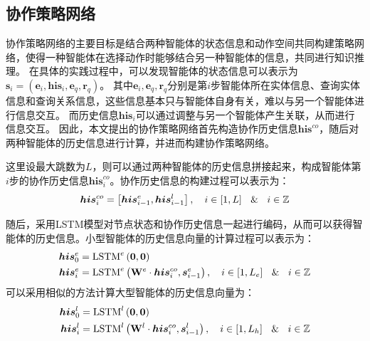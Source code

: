 \documentclass[algorithmlist, AutoFakeBold, AutoFakeSlant, figurelist, tablelist, nomlist, engineering, openany]{seuthesix} %
\begin{document}
\subsection{协作策略网络}
协作策略网络的主要目标是结合两种智能体的状态信息和动作空间共同构建策略网络，使得一种智能体在选择动作时能够结合另一种智能体的信息，共同进行知识推理。
在具体的实践过程中，可以发现智能体的状态信息可以表示为$\bm{s}_i = (\bm{e}_i, \bm{his}_i, \bm{e}_q, \bm{r}_q)$。
其中$\bm{e}_i, \bm{e}_q, \bm{r}_q$分别是第$i$步智能体所在实体信息、查询实体信息和查询关系信息，这些信息基本只与智能体自身有关，难以与另一个智能体进行信息交互。
而历史信息$\bm{his}_i$可以通过调整与另一个智能体产生关联，从而进行信息交互。
因此，本文提出的协作策略网络首先构造协作历史信息$\bm{his}^{co}$，随后对两种智能体的历史信息进行计算，并进而构建协作策略网络。

这里设最大跳数为$L$，则可以通过两种智能体的历史信息拼接起来，构成智能体第$i$步的协作历史信息$\bm{his}_i^{co}$。协作历史信息的构建过程可以表示为：
\begin{equation}
  \bm{his}_{i}^{co} = \left[\bm{his}_{i-1}^e, \bm{his}_{i-1}^l\right], \quad i \in [1, L] \  \And \  i \in \mathbb{Z}
  \label{his_1}
\end{equation}

随后，采用LSTM模型对节点状态和协作历史信息一起进行编码，从而可以获得智能体的历史信息。小型智能体的历史信息向量的计算过程可以表示为：
\begin{equation}
  \begin{aligned}
    \bm{his}_0^e &= \operatorname{LSTM}^e\left(\bm{0}, \bm{0}\right) \\
    \bm{his}_i^e &= \operatorname{LSTM}^e\left(\mathbf{W}^e \cdot \bm{his}_i^{co}, \bm{s}_{i-1}^e\right),\quad i \in [1, L_e] \  \And \  i \in \mathbb{Z}
  \end{aligned}
  \label{his_2}
\end{equation}
可以采用相似的方法计算大型智能体的历史信息向量为：
\begin{equation}
  \begin{aligned}
    \bm{his}_0^l &=\operatorname{LSTM}^l\left(\bm{0}, \bm{0}\right) \\
    \bm{his}_i^l &= \operatorname{LSTM}^l\left(\mathbf{W}^l \cdot \bm{his}_i^{co}, \bm{s}_{i-1}^l\right),\quad i \in [1, L_h] \  \And \  i \in \mathbb{Z}
  \end{aligned}
  \label{his_3}
\end{equation}
\end{document}
